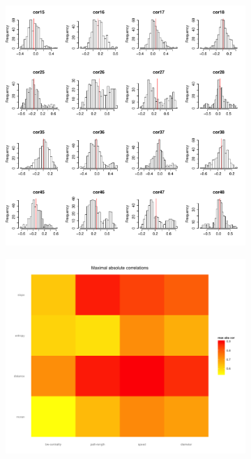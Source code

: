 \begin{figure}

\begin{subfigure}[t]{0.35\linewidth}
\includegraphics[width=\textwidth]{figures/hist_crossCorMat_breaks30}
\caption{}
\end{subfigure}
\begin{subfigure}[t]{0.23\linewidth}
\vspace{-6.5cm}
\includegraphics[width=\textwidth]{figures/heatmap_maxAbsCor}\\

\end{subfigure}
\end{figure}

